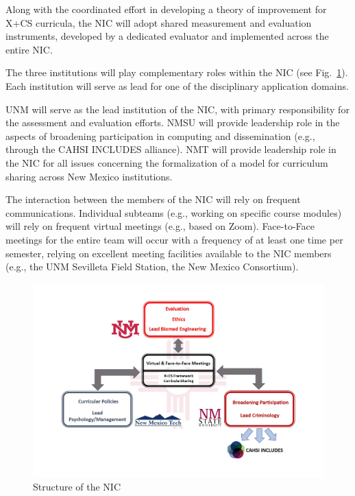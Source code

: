 Along with the coordinated effort in developing a theory of improvement for X+CS curricula, the NIC will adopt shared measurement and evaluation instruments, developed by a dedicated evaluator and implemented across the entire NIC. 

The three institutions will play complementary roles within the NIC (see Fig.~\ref{nic}). Each institution will serve as lead for one of the disciplinary application domains.

UNM will serve as the lead institution of the NIC, with primary responsibility for the assessment and evaluation efforts.
NMSU will provide leadership role in the aspects of broadening participation in computing and dissemination (e.g., through the CAHSI INCLUDES alliance).
NMT will provide leadership role in the NIC for all issues concerning the formalization of a model for curriculum sharing across New Mexico institutions. 

The interaction between the members of the NIC will  rely on frequent communications. Individual subteams (e.g., working on specific course modules) will rely on frequent virtual meetings (e.g., based on Zoom). Face-to-Face meetings for the entire team will occur with a frequency of at least one time per semester, relying on excellent meeting facilities available to the NIC members (e.g., the UNM Sevilleta Field Station, the New Mexico Consortium).

\begin{figure}[htbp]
\centerline{\includegraphics[width=.8\textwidth]{nic.pdf}}
\caption{Structure of the NIC}
\label{nic}
\end{figure}


